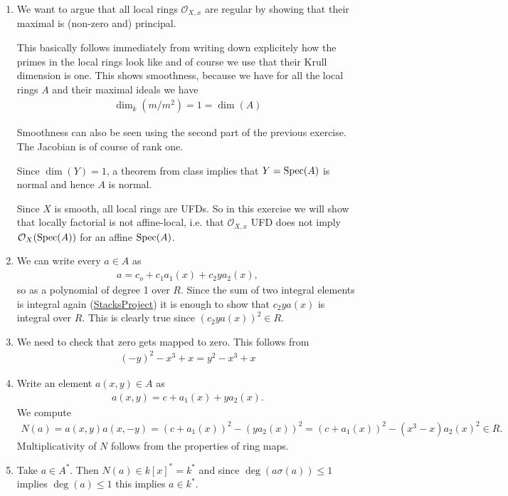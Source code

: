 \begin{exercise}{3}
    \begin{enumerate}
        \item We want to argue that all local rings $\mathcal{O}_{X,x}$ are regular by showing that their maximal is (non-zero
        and) principal.

        This basically follows immediately from writing down explicitely how the primes in the local rings look like and of course
        we use that their Krull dimension is one. This shows smoothness, because we have for all the local rings $A$ and their
         maximal ideals we have
        \begin{align*}
            \dim_k(m/m^2)=1=\dim(A)
        \end{align*}

        Smoothness can also be seen using the second part of the previous exercise. The Jacobian is of course of rank one.


        Since $\dim(Y)=1$, a theorem from class implies that $Y=\operatorname{Spec}(A)$ is normal and hence $A$ is normal.

        Since $X$ is smooth, all local rings are UFDs. So in this exercise we will show that locally factorial is not affine-local, i.e.
        that $\mathcal{O}_{X,x}$ UFD does not imply $\mathcal{O}_X(\operatorname{Spec}(A))$ for an affine $\operatorname{Spec}(A)$.
        \item We can write every $a\in A$ as 
        \begin{align*}
            a=c_o+c_1a_1(x)+c_2ya_2(x),
        \end{align*}
        so as a polynomial of degree 1 over $R$. Since the sum of two integral elements is integral again (\href{https://stacks.math.columbia.edu/tag/00GO}{StacksProject})
        it is enough to show that $c_2ya(x)$ is integral over $R$. This is clearly true since $(c_2ya(x))^2\in R$.
        \item We need to check that zero gets mapped to zero. This follows from
        \begin{align*}
            (-y)^2-x^3+x=y^2-x^3+x
        \end{align*}
        \item Write an element $a(x,y)\in A$ as 
        \begin{align*}
            a(x,y)=c+a_1(x)+ya_2(x).
        \end{align*}
        We compute 
        \begin{align*}
            N(a)=a(x,y)a(x,-y)=(c+a_1(x))^2-(ya_2(x))^2=(c+a_1(x))^2-(x^3-x)a_2(x)^2\in R.
        \end{align*}
        Multiplicativity of $N$ follows from the properties of ring maps.
        \item Take $a\in A^*$. Then $N(a)\in k[x]^*=k^*$ and since $\deg(a\sigma(a))\leq 1$ implies $\deg(a)\leq 1$ this implies $a\in k^*$.


\end{enumerate}
\end{exercise}
